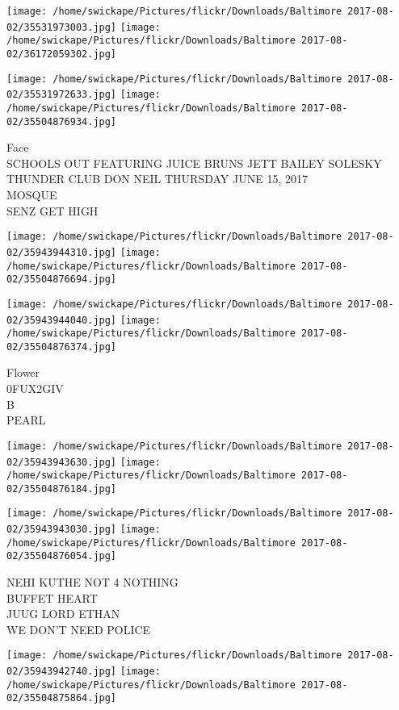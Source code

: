 \documentclass[10pt,letterpaper]{article}
\begin{document}
\texttt{[image: /home/swickape/Pictures/flickr/Downloads/Baltimore 2017-08-02/35531973003.jpg]}
\texttt{[image: /home/swickape/Pictures/flickr/Downloads/Baltimore 2017-08-02/36172059302.jpg]}

\texttt{[image: /home/swickape/Pictures/flickr/Downloads/Baltimore 2017-08-02/35531972633.jpg]}
\texttt{[image: /home/swickape/Pictures/flickr/Downloads/Baltimore 2017-08-02/35504876934.jpg]}

Face\\
SCHOOLS OUT FEATURING JUICE BRUNS JETT BAILEY SOLESKY THUNDER CLUB DON NEIL THURSDAY JUNE 15, 2017\\
MOSQUE\\
SENZ GET HIGH
\pagebreak

\texttt{[image: /home/swickape/Pictures/flickr/Downloads/Baltimore 2017-08-02/35943944310.jpg]}
\texttt{[image: /home/swickape/Pictures/flickr/Downloads/Baltimore 2017-08-02/35504876694.jpg]}

\texttt{[image: /home/swickape/Pictures/flickr/Downloads/Baltimore 2017-08-02/35943944040.jpg]}
\texttt{[image: /home/swickape/Pictures/flickr/Downloads/Baltimore 2017-08-02/35504876374.jpg]}

Flower\\
0FUX2GIV\\
B\\
PEARL
\pagebreak

\texttt{[image: /home/swickape/Pictures/flickr/Downloads/Baltimore 2017-08-02/35943943630.jpg]}
\texttt{[image: /home/swickape/Pictures/flickr/Downloads/Baltimore 2017-08-02/35504876184.jpg]}

\texttt{[image: /home/swickape/Pictures/flickr/Downloads/Baltimore 2017-08-02/35943943030.jpg]}
\texttt{[image: /home/swickape/Pictures/flickr/Downloads/Baltimore 2017-08-02/35504876054.jpg]}

NEHI KUTHE NOT 4 NOTHING\\
BUFFET HEART\\
JUUG LORD ETHAN\\
WE DON'T NEED POLICE
\pagebreak

\texttt{[image: /home/swickape/Pictures/flickr/Downloads/Baltimore 2017-08-02/35943942740.jpg]}
\texttt{[image: /home/swickape/Pictures/flickr/Downloads/Baltimore 2017-08-02/35504875864.jpg]}
\end{document}
